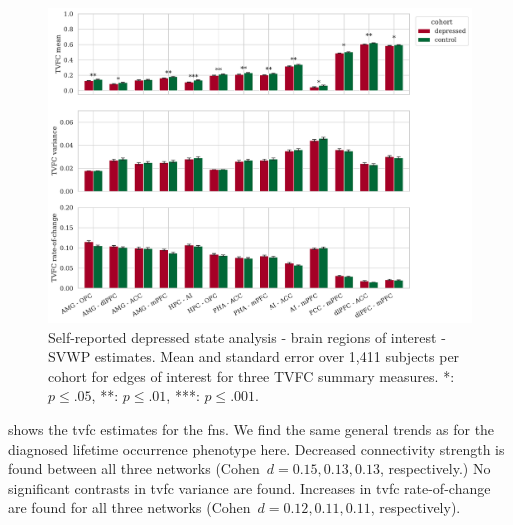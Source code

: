 \begin{figure}[h]
  \centering
  \includegraphics[width=\textwidth]{fig/ukbiobank/TVFC_predictions_summaries/self_reported_depression_state/cohort_comparison/ROI/correlation_all_TVFC_summary_measures_SVWP_joint_edges_of_interest}
  \caption{
    Self-reported depressed state analysis - brain regions of interest - SVWP estimates.
    Mean and standard error over 1,411 subjects per cohort for edges of interest for three TVFC summary measures.
    *: $p \leq .05$, **: $p \leq .01$, ***: $p \leq .001$.
  }\label{fig:ukb-results-srds-roi-cohort-comparison-edges-of-interest-wp}
\end{figure}


 shows the \gls{tvfc} estimates for the \glspl{fn}.
We find the same general trends as for the diagnosed lifetime occurrence phenotype here.
Decreased connectivity strength is found between all three networks (Cohen~$d = 0.15, 0.13, 0.13$, respectively.)
%
No significant contrasts in \gls{tvfc} variance are found.
Increases in \gls{tvfc} rate-of-change are found for all three networks (Cohen~$d = 0.12, 0.11, 0.11$, respectively).



